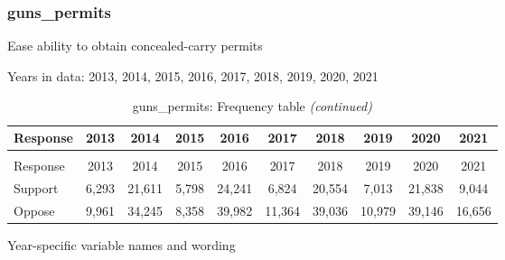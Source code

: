 \documentclass[
  12pt]{article}
\begin{document}
\hypertarget{guns_permits}{%
\subsubsection{guns\_permits}\label{guns_permits}}

Ease ability to obtain concealed-carry permits

Years in data: 2013, 2014, 2015, 2016, 2017, 2018, 2019, 2020,
2021\begingroup\fontsize{10}{12}\selectfont

\begin{longtable}[t]{lccccccccc}
\caption{\label{tab:unnamed-chunk-5}guns\_permits: Frequency table}\\
\toprule
Response & 2013 & 2014 & 2015 & 2016 & 2017 & 2018 & 2019 & 2020 & 2021\\
\midrule
\endfirsthead
\caption[]{guns\_permits: Frequency table \textit{(continued)}}\\
\toprule
Response & 2013 & 2014 & 2015 & 2016 & 2017 & 2018 & 2019 & 2020 & 2021\\
\midrule
\endhead

\endfoot
\bottomrule
\endlastfoot
Support & 6,293 & 21,611 & 5,798 & 24,241 & 6,824 & 20,554 & 7,013 & 21,838 & 9,044\\
Oppose & 9,961 & 34,245 & 8,358 & 39,982 & 11,364 & 39,036 & 10,979 & 39,146 & 16,656\\*
\end{longtable}
\endgroup{}

Year-specific variable names and
wording\begingroup\fontsize{11}{13}\selectfont
\end{document}
